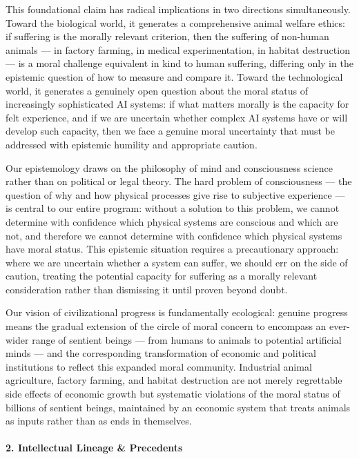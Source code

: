 This foundational claim has radical implications in two directions
simultaneously. Toward the biological world, it generates a
comprehensive animal welfare ethics: if suffering is the morally
relevant criterion, then the suffering of non-human animals --- in
factory farming, in medical experimentation, in habitat destruction ---
is a moral challenge equivalent in kind to human suffering, differing
only in the epistemic question of how to measure and compare it. Toward
the technological world, it generates a genuinely open question about
the moral status of increasingly sophisticated AI systems: if what
matters morally is the capacity for felt experience, and if we are
uncertain whether complex AI systems have or will develop such capacity,
then we face a genuine moral uncertainty that must be addressed with
epistemic humility and appropriate caution.

Our epistemology draws on the philosophy of mind and consciousness
science rather than on political or legal theory. The hard problem of
consciousness --- the question of why and how physical processes give
rise to subjective experience --- is central to our entire program:
without a solution to this problem, we cannot determine with confidence
which physical systems are conscious and which are not, and therefore we
cannot determine with confidence which physical systems have moral
status. This epistemic situation requires a precautionary approach:
where we are uncertain whether a system can suffer, we should err on the
side of caution, treating the potential capacity for suffering as a
morally relevant consideration rather than dismissing it until proven
beyond doubt.

Our vision of civilizational progress is fundamentally ecological:
genuine progress means the gradual extension of the circle of moral
concern to encompass an ever-wider range of sentient beings --- from
humans to animals to potential artificial minds --- and the
corresponding transformation of economic and political institutions to
reflect this expanded moral community. Industrial animal agriculture,
factory farming, and habitat destruction are not merely regrettable side
effects of economic growth but systematic violations of the moral status
of billions of sentient beings, maintained by an economic system that
treats animals as inputs rather than as ends in themselves.

\paragraph{2. Intellectual Lineage \&
Precedents}\label{intellectual-lineage-precedents-32}

